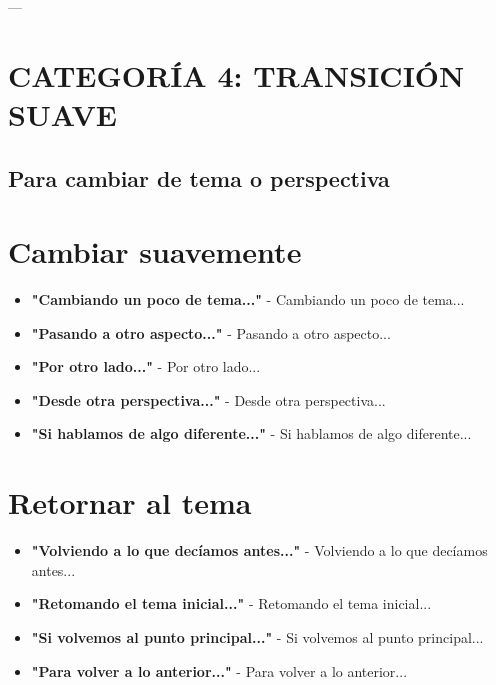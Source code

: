 \documentclass[a4paper,11pt]{article}
\begin{document}
\vspace{0.2cm}

---

\vspace{0.2cm}

\section{CATEGORÍA 4: TRANSICIÓN SUAVE}

\vspace{0.2cm}

\subsection{Para cambiar de tema o perspectiva}

\vspace{0.2cm}

\section{Cambiar suavemente}

\begin{itemize}

  \item \textbf{"Cambiando un poco de tema..."} - Cambiando un poco de tema...

  \item \textbf{"Pasando a otro aspecto..."} - Pasando a otro aspecto...

  \item \textbf{"Por otro lado..."} - Por otro lado...

  \item \textbf{"Desde otra perspectiva..."} - Desde otra perspectiva...

  \item \textbf{"Si hablamos de algo diferente..."} - Si hablamos de algo diferente...

\end{itemize}

\vspace{0.2cm}

\section{Retornar al tema}

\begin{itemize}

  \item \textbf{"Volviendo a lo que decíamos antes..."} - Volviendo a lo que decíamos antes...

  \item \textbf{"Retomando el tema inicial..."} - Retomando el tema inicial...

  \item \textbf{"Si volvemos al punto principal..."} - Si volvemos al punto principal...

  \item \textbf{"Para volver a lo anterior..."} - Para volver a lo anterior...

\end{itemize}
\end{document}
